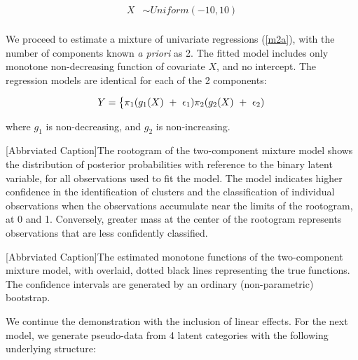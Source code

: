 \documentclass[fleqn,10pt]{olplainarticle}\usepackage[]{graphicx}\usepackage[]{color}
\begin{document}
\begin{align*}
  X &\sim Uniform(-10,10) \\
\end{align*}


We proceed to estimate a mixture of univariate regressions (\ref{m2a}), with the number of components known \emph{a priori} as 2. The fitted model includes only monotone non-decreasing function of covariate $X$, and no intercept. The regression models are identical for each of the 2 components:

\begin{equation} \label{m2a}
  Y = 
  \begin{dcases}
    \pi_1 (g_{1} (X) \ +\  \epsilon_1)
    \pi_2 (g_{2} (X) \ +\  \epsilon_2)
  \end{dcases}
\end{equation}

where $g_{1}$ is non-decreasing, and $g_{2}$ is non-increasing.

\begin{minipage}{0.8\textwidth}

[Abbrviated Caption]{The rootogram of the two-component mixture model shows the distribution of posterior probabilities with reference to the binary latent variable, for all observations used to fit the model. The model indicates higher confidence in the identification of clusters and the classification of individual observations when the observations accumulate near the limits of the rootogram, at 0 and 1. Conversely, greater mass at the center of the rootogram represents observations that are less confidently classified.}
\end{minipage}

\begin{minipage}{0.8\textwidth}


[Abbrviated Caption]{The estimated monotone functions of the two-component mixture model, with overlaid, dotted black lines representing the true functions. The confidence intervals are generated by an ordinary (non-parametric) bootstrap.}
\end{minipage}





We continue the demonstration with the inclusion of linear effects. For the next model, we generate pseudo-data from 4 latent categories with the following underlying structure:
\end{document}
